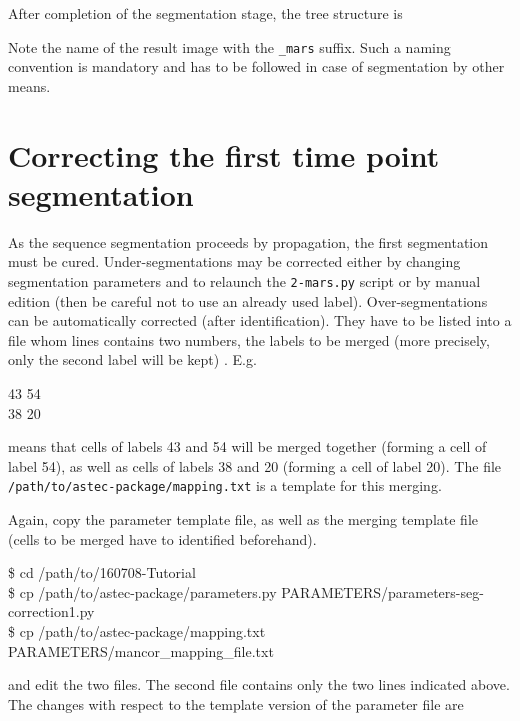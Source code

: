 After completion of the segmentation stage, the tree structure is 

Note the name of the result image with the \texttt{\_mars} suffix. Such a naming convention is mandatory and has to be followed in case of segmentation by other means.










\section{Correcting the first time point segmentation}

As the sequence segmentation proceeds by propagation, the first segmentation must be cured. Under-segmentations may be corrected either by changing segmentation parameters and to relaunch the \texttt{2-mars.py}  script or by manual edition (then be careful not to use an already used label). Over-segmentations can be automatically corrected (after identification). They have to be listed into a file whom lines contains two numbers, the labels to be merged (more precisely, only the second label will be kept) . E.g.
\begin{code}{0.8}
43 54\\
38 20
\end{code}
means that cells of labels 43 and 54 will be merged together (forming a cell of label 54), as well as cells of labels 38 and 20 (forming a cell of label 20).
The file \texttt{/path/to/astec-package/mapping.txt} is a template for this merging.


Again, copy the parameter template file, as well as the merging template file (cells to be merged have to identified beforehand).

\begin{code}{0.8}
\$ cd /path/to/160708-Tutorial\\
\$ cp /path/to/astec-package/parameters.py PARAMETERS/parameters-seg-correction1.py \\
\$ cp /path/to/astec-package/mapping.txt PARAMETERS/mancor\_mapping\_file.txt
\end{code}

and edit the two files. The second file contains only the two lines indicated above.
The changes with respect to the template version of the parameter file are

